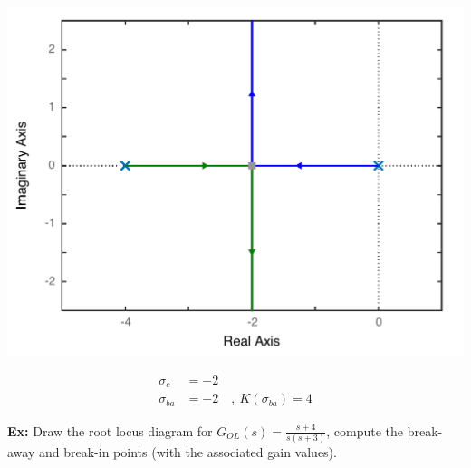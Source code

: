 \documentclass[twoside]{article}
\begin{document}
\begin{enumerate}
\begin{minipage}[h]{0.5\linewidth}
    \begin{center}
      \includegraphics[width=\textwidth]{break_away}
    \end{center}
\end{minipage}
\begin{minipage}[h]{0.5\linewidth}
	\begin{align*}
	\sigma_c &=  -2
	\\
	\sigma_{ba} &=  -2 \quad , \ K(\sigma_{ba}) = 4
	\end{align*}
\end{minipage}

\vspace{12pt}

\textbf{Ex:} Draw the root locus diagram for $G_{OL}(s) = \frac{s+4}{s (s+3)}$,
compute the break-away and break-in points (with the associated gain values).


\end{enumerate}
\end{document}
